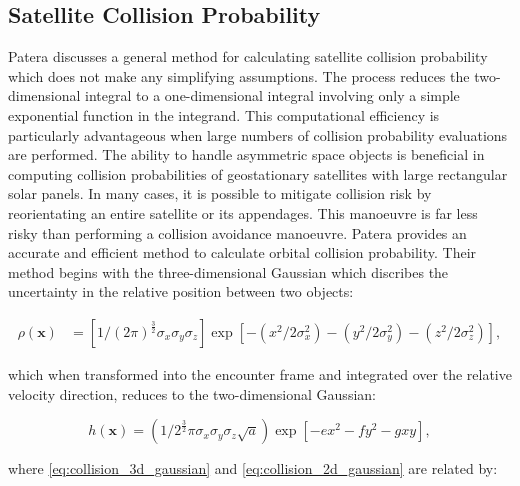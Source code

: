 \subsection{Satellite Collision Probability}

Patera \cite{Patera2001} discusses a general method for calculating satellite collision probability which does not make any simplifying assumptions. The process reduces the two-dimensional integral to a one-dimensional integral involving only a simple exponential function in the integrand. This computational efficiency is particularly advantageous when large numbers of collision probability evaluations are performed. The ability to handle asymmetric space objects is beneficial in computing collision probabilities of geostationary satellites with large rectangular solar panels. In many cases, it is possible to mitigate collision risk by reorientating an entire satellite or its appendages. This manoeuvre is far less risky than performing a collision avoidance manoeuvre. Patera provides an accurate and efficient method to calculate orbital collision probability. Their method begins with the three-dimensional Gaussian which discribes the uncertainty in the relative position between two objects:

\begin{equation}
    \begin{aligned}
        \rho(\boldsymbol{x}) &=\left[1 /(2 \pi)^{\frac{3}{2}} \sigma_{x} \sigma_{y} \sigma_{z}\right] \exp \left[-\left(x^{2} / 2 \sigma_{x}^{2}\right)-\left(y^{2} / 2 \sigma_{y}^{2}\right)-\left(z^{2} / 2 \sigma_{z}^{2}\right)\right],
    \end{aligned}
    \label{eq:collision_3d_gaussian}
\end{equation}

which when transformed into the encounter frame and integrated over the relative velocity direction, reduces to the two-dimensional Gaussian:

\begin{equation}
    h(\boldsymbol{x})=\left(1 / 2^{\frac{3}{2}} \pi \sigma_{x} \sigma_{y} \sigma_{z} \sqrt{a}\right) \exp \left[-e x^{2}-f y^{2}-g x y\right],
    \label{eq:collision_2d_gaussian}
\end{equation}

where \autoref{eq:collision_3d_gaussian} and \autoref{eq:collision_2d_gaussian} are related by:


